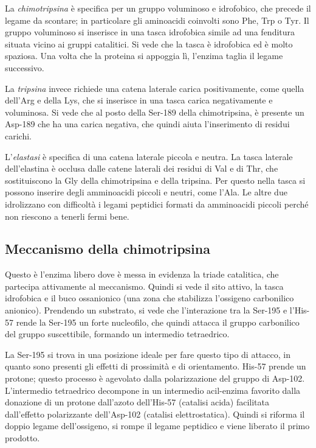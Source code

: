 La \emph{chimotripsina} è specifica per un gruppo voluminoso e idrofobico, che precede il legame da scontare; in particolare gli aminoacidi coinvolti sono Phe, Trp o Tyr. Il gruppo voluminoso si inserisce in una tasca idrofobica simile ad una fenditura situata vicino ai gruppi catalitici.
Si vede che la tasca è idrofobica ed è molto spaziosa. Una volta che la proteina si appoggia lì, l'enzima taglia il legame successivo.


La \emph{tripsina} invece richiede una catena laterale carica positivamente, come quella dell'Arg e della Lys, che si inserisce in una tasca carica negativamente e voluminosa.
Si vede che al posto della Ser-189 della chimotripsina, è presente un Asp-189 che ha una carica negativa, che quindi aiuta l'inserimento di residui carichi.

L'\emph{elastasi} è specifica di una catena laterale piccola e neutra. La tasca laterale dell'elastina è occlusa dalle catene laterali dei residui di Val e di Thr, che sostituiscono la Gly della chimotripsina e della tripsina. Per questo nella tasca si possono inserire degli amminoacidi piccoli e neutri, come l'Ala. Le altre due idrolizzano con difficoltà i legami peptidici formati da amminoacidi piccoli perché non riescono a tenerli fermi bene.

\subsection{Meccanismo della chimotripsina}

Questo è l'enzima libero dove è messa in evidenza la triade catalitica, che partecipa attivamente al meccanismo. Quindi si vede il sito attivo, la tasca idrofobica e il buco ossanionico (una zona che stabilizza l'ossigeno carbonilico anionico).
Prendendo un substrato, si vede che l'interazione tra la Ser-195 e l'His-57 rende la Ser-195 un forte nucleofilo, che quindi attacca il gruppo carbonilico del gruppo suscettibile, formando un intermedio tetraedrico.


La Ser-195 si trova in una posizione ideale per fare questo tipo di attacco, in quanto sono presenti gli effetti di prossimità e di orientamento. His-57 prende un protone; questo processo è agevolato dalla polarizzazione del gruppo  di Asp-102.
L'intermedio tetraedrico decompone in un intermedio acil-enzima favorito dalla donazione di un protone dall'azoto dell'His-57 (catalisi acida) facilitata dall'effetto polarizzante dell'Asp-102 (catalisi elettrostatica). Quindi si riforma il doppio legame dell'ossigeno, si rompe il legame peptidico e viene liberato il primo prodotto.


